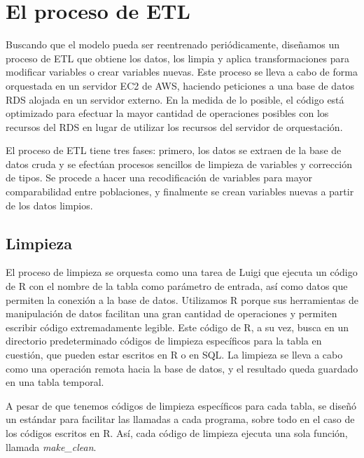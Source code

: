 \chapter{El proceso de ETL}
\label{chap:etl}
Buscando que el modelo pueda ser reentrenado periódicamente, diseñamos un proceso de ETL que obtiene los datos, los limpia y aplica transformaciones para modificar variables o crear variables nuevas. Este proceso se lleva a cabo de forma orquestada en un servidor EC2 de AWS, haciendo peticiones a una base de datos RDS alojada en un servidor externo. En la medida de lo posible, el código está optimizado para efectuar la mayor cantidad de operaciones posibles con los recursos del RDS en lugar de utilizar los recursos del servidor de orquestación.
\par
\noindent
El proceso de ETL tiene tres fases: primero, los datos se extraen de la base de datos cruda y se efectúan procesos sencillos de limpieza de variables y corrección de tipos. Se procede a hacer una recodificación de variables para mayor comparabilidad entre poblaciones, y finalmente se crean variables nuevas a partir de los datos limpios.
\section*{Limpieza}
El proceso de limpieza se orquesta como una tarea de Luigi que ejecuta un código de R con el nombre de la tabla como parámetro de entrada, así como datos que permiten la conexión a la base de datos. Utilizamos R porque sus herramientas de manipulación de datos facilitan una gran cantidad de operaciones y permiten escribir código extremadamente legible. Este código de R, a su vez, busca en un directorio predeterminado códigos de limpieza específicos para la tabla en cuestión, que pueden estar escritos en R o en SQL. La limpieza se lleva a cabo como una operación remota hacia la base de datos, y el resultado queda guardado en una tabla temporal.
\par
\noindent
A pesar de que tenemos códigos de limpieza específicos para cada tabla, se diseñó un estándar para facilitar las llamadas a cada programa, sobre todo en el caso de los códigos escritos en R. Así, cada código de limpieza ejecuta una sola función, llamada \textit{make\_clean}.
